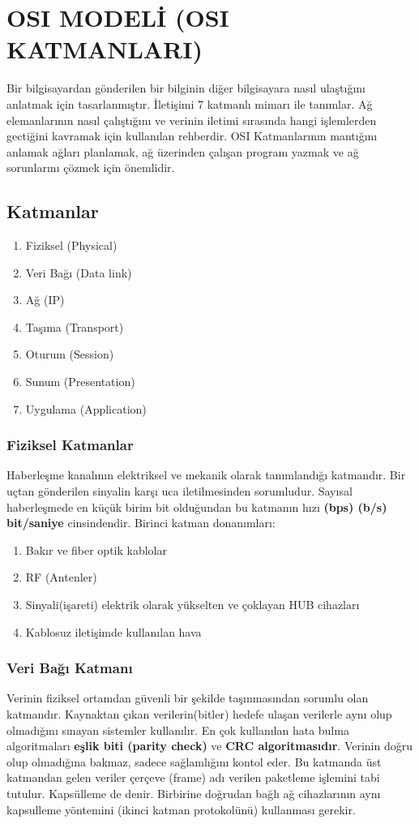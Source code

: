 \section{OSI MODELİ (OSI KATMANLARI)}
Bir bilgisayardan gönderilen bir bilginin diğer bilgisayara nasıl ulaştığını anlatmak için tasarlanmıştır.
İletişimi 7 katmanlı mimarı ile tanımlar.
Ağ elemanlarının nasıl çalıştığını ve verinin iletimi sırasında hangi işlemlerden gectiğini kavramak için kullanılan rehberdir.
OSI Katmanlarının mantığını anlamak ağları planlamak, ağ üzerinden çalışan program yazmak ve ağ sorunlarını çözmek için önemlidir.

\subsection{Katmanlar}
\begin{enumerate}
	\item Fiziksel (Physical)
	\item Veri Bağı (Data link)
	\item Ağ (IP)
	\item Taşıma (Transport)
	\item Oturum (Session)
	\item Sunum (Presentation)
	\item Uygulama (Application)
\end{enumerate}

\subsubsection{Fiziksel Katmanlar}
Haberleşme kanalının elektriksel ve mekanik olarak tanımlandığı katmandır.
Bir uçtan gönderilen sinyalin karşı uca iletilmesinden sorumludur.
Sayısal haberleşmede en küçük birim bit olduğundan bu katmanın hızı \textbf{(bps) (b/s) bit/saniye} cinsindendir.
Birinci katman donanımları:
\begin{enumerate}
	\item Bakır ve fiber optik kablolar
	\item RF (Antenler)
	\item Sinyali(işareti) elektrik olarak yükselten ve çoklayan HUB cihazları
	\item Kablosuz iletişimde kullanılan hava
\end{enumerate}

\subsubsection{Veri Bağı Katmanı}
Verinin fiziksel ortamdan güvenli bir şekilde taşınmasından sorumlu olan katmandır.
Kaynaktan çıkan verilerin(bitler) hedefe ulaşan verilerle aynı olup olmadığını sınayan sistemler kullanılır.
En çok kullanılan hata bulma algoritmaları \textbf{eşlik biti (parity check)} ve \textbf{CRC algoritmasıdır}.
Verinin doğru olup olmadığına bakmaz, sadece sağlamlığını kontol eder.
Bu katmanda üst katmandan gelen veriler çerçeve (frame) adı verilen paketleme işlemini tabi tutulur.
Kapsülleme de denir.
Birbirine doğrudan bağlı ağ cihazlarının aynı kapsulleme yöntemini (ikinci katman protokolünü) kullanması gerekir.

